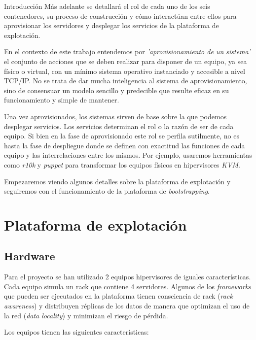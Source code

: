 \documentclass[a4paper,12pt,spanish,final]{epsc_tfc_pfc}
\begin{document}
\begin{intro}{Introducción}
Más adelante se detallará el rol de cada uno de los seis contenedores, su proceso de construcción y cómo interactúan entre ellos para aprovisionar los servidores y desplegar los servicios de la plataforma de explotación.

En el contexto de este trabajo entendemos por \emph{'aprovisionamiento de un sistema'} el conjunto de acciones que se deben realizar para disponer de un equipo, ya sea físico o virtual, con un mínimo sistema operativo instanciado y accesible a nivel TCP/IP\@. No se trata de dar mucha inteligencia al sistema de aprovisionamiento, sino de consensuar un modelo sencillo y predecible que resulte eficaz en su funcionamiento y simple de mantener.

Una vez aprovisionados, los sistemas sirven de base sobre la que podemos desplegar servicios. Los servicios determinan el rol o la razón de ser de cada equipo. Si bien en la fase de aprovisionado este rol se perfila sutilmente, no es hasta la fase de despliegue donde se definen con exactitud las funciones de cada equipo y las interrelaciones entre los mismos. Por ejemplo, usaremos herramientas como \emph{r10k} y \emph{puppet} para transformar los equipos físicos en hipervisores \emph{KVM}.

Empezaremos viendo algunos detalles sobre la plataforma de explotación y seguiremos con el funcionamiento de la plataforma de \emph{bootstrapping}.
\end{intro}

\pagestyle{fancy}


\chapter{Plataforma de explotación}
\section{Hardware}
Para el proyecto se han utilizado 2 equipos hipervisores de iguales características. Cada equipo simula un rack que contiene 4 servidores. Algunos de los \emph{frameworks} que pueden ser ejecutados en la plataforma tienen consciencia de rack (\emph{rack awareness}) y distribuyen réplicas de los datos de manera que optimizan el uso de la red (\emph{data locality}) y minimizan el riesgo de pérdida.

Los equipos tienen las siguientes características:
\end{document}
